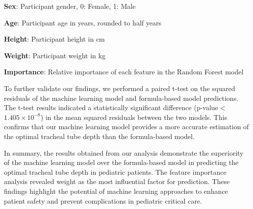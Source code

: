 \documentclass[11pt]{article}
\begin{document}
\begin{table}[h]
\caption{Feature Importances in Random Forest Model}
\label{table:importance}
\begin{threeparttable}
\renewcommand{\TPTminimum}{\linewidth}
\begin{tablenotes}
\footnotesize
\item \textbf{Sex}: Participant gender, 0: Female, 1: Male
\item \textbf{Age}: Participant age in years, rounded to half years
\item \textbf{Height}: Participant height in cm
\item \textbf{Weight}: Participant weight in kg
\item \textbf{Importance}: Relative importance of each feature in the Random Forest model
\end{tablenotes}
\end{threeparttable}
\end{table}


To further validate our findings, we performed a paired t-test on the squared residuals of the machine learning model and formula-based model predictions. The t-test results indicated a statistically significant difference (p-value$<$$1.405 \times 10^{-8}$) in the mean squared residuals between the two models. This confirms that our machine learning model provides a more accurate estimation of the optimal tracheal tube depth than the formula-based model.

In summary, the results obtained from our analysis demonstrate the superiority of the machine learning model over the formula-based model in predicting the optimal tracheal tube depth in pediatric patients. The feature importance analysis revealed weight as the most influential factor for prediction. These findings highlight the potential of machine learning approaches to enhance patient safety and prevent complications in pediatric critical care.


\clearpage
\appendix
\end{document}
